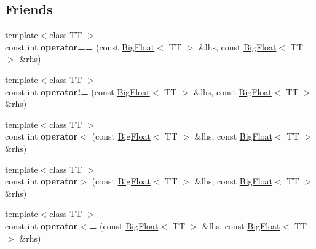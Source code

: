 \subsection*{Friends}
\begin{DoxyCompactItemize}
\item 
\hypertarget{classatl_1_1_big_float_adf9907e850610854396c7fabc8009987}{{\footnotesize template$<$class T\+T $>$ }\\const int {\bfseries operator==} (const \hyperlink{classatl_1_1_big_float}{Big\+Float}$<$ T\+T $>$ \&lhs, const \hyperlink{classatl_1_1_big_float}{Big\+Float}$<$ T\+T $>$ \&rhs)}\label{classatl_1_1_big_float_adf9907e850610854396c7fabc8009987}

\item 
\hypertarget{classatl_1_1_big_float_a71b02f8a0f7c879a60caae6267fb7128}{{\footnotesize template$<$class T\+T $>$ }\\const int {\bfseries operator!=} (const \hyperlink{classatl_1_1_big_float}{Big\+Float}$<$ T\+T $>$ \&lhs, const \hyperlink{classatl_1_1_big_float}{Big\+Float}$<$ T\+T $>$ \&rhs)}\label{classatl_1_1_big_float_a71b02f8a0f7c879a60caae6267fb7128}

\item 
\hypertarget{classatl_1_1_big_float_ad8c347c8785f34b09a28ab2cc90617f9}{{\footnotesize template$<$class T\+T $>$ }\\const int {\bfseries operator$<$} (const \hyperlink{classatl_1_1_big_float}{Big\+Float}$<$ T\+T $>$ \&lhs, const \hyperlink{classatl_1_1_big_float}{Big\+Float}$<$ T\+T $>$ \&rhs)}\label{classatl_1_1_big_float_ad8c347c8785f34b09a28ab2cc90617f9}

\item 
\hypertarget{classatl_1_1_big_float_acf0bbe832bf4a3386af93693e0ce2b8a}{{\footnotesize template$<$class T\+T $>$ }\\const int {\bfseries operator$>$} (const \hyperlink{classatl_1_1_big_float}{Big\+Float}$<$ T\+T $>$ \&lhs, const \hyperlink{classatl_1_1_big_float}{Big\+Float}$<$ T\+T $>$ \&rhs)}\label{classatl_1_1_big_float_acf0bbe832bf4a3386af93693e0ce2b8a}

\item 
\hypertarget{classatl_1_1_big_float_a628acff81466661dac42c5b4a019a0c3}{{\footnotesize template$<$class T\+T $>$ }\\const int {\bfseries operator$<$=} (const \hyperlink{classatl_1_1_big_float}{Big\+Float}$<$ T\+T $>$ \&lhs, const \hyperlink{classatl_1_1_big_float}{Big\+Float}$<$ T\+T $>$ \&rhs)}\label{classatl_1_1_big_float_a628acff81466661dac42c5b4a019a0c3}


\end{DoxyCompactItemize}
